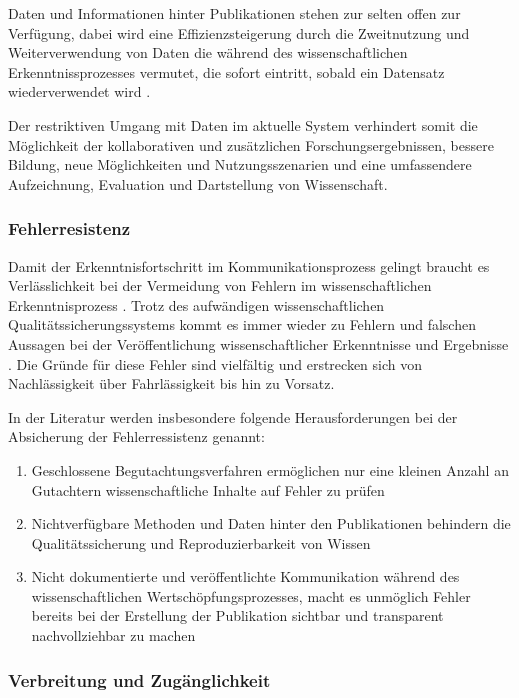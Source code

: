 Daten und Informationen hinter Publikationen stehen zur selten offen zur Verfügung, dabei wird eine Effizienzsteigerung durch die Zweitnutzung und Weiterverwendung von Daten die während des wissenschaftlichen Erkenntnissprozesses vermutet, die sofort eintritt, sobald ein Datensatz wiederverwendet wird \cite{RIN_2010_open_research}.

Der restriktiven Umgang mit Daten im aktuelle System verhindert somit die Möglichkeit der kollaborativen und zusätzlichen Forschungsergebnissen, bessere Bildung, neue Möglichkeiten und Nutzungsszenarien und eine umfassendere Aufzeichnung, Evaluation und Dartstellung von Wissenschaft.

\subsubsection{Fehlerresistenz}

Damit der Erkenntnisfortschritt im Kommunikationsprozess gelingt braucht es Verlässlichkeit bei der Vermeidung von Fehlern im wissenschaftlichen Erkenntnisprozess \cite{Bargheer_2015}. Trotz des aufwändigen wissenschaftlichen Qualitätssicherungssystems kommt es immer wieder zu Fehlern und falschen Aussagen bei der Veröffentlichung wissenschaftlicher Erkenntnisse und Ergebnisse \cite{brembs2015open} \cite{Luescher_2014}. Die Gründe für diese Fehler sind vielfältig und erstrecken sich von  Nachlässigkeit über Fahrlässigkeit bis hin zu Vorsatz.

In der Literatur werden insbesondere folgende Herausforderungen bei der Absicherung der Fehlerressistenz genannt:
\begin{enumerate}
\item Geschlossene Begutachtungsverfahren ermöglichen nur eine kleinen Anzahl an Gutachtern wissenschaftliche Inhalte auf Fehler zu prüfen \cite{suchen}
\item Nichtverfügbare Methoden und Daten hinter den Publikationen behindern die Qualitätssicherung und Reproduzierbarkeit von Wissen \cite{suchen}
\item Nicht dokumentierte und veröffentlichte Kommunikation während des wissenschaftlichen Wertschöpfungsprozesses, macht es unmöglich Fehler bereits bei der Erstellung der Publikation sichtbar und transparent nachvollziehbar zu machen \cite{suchen}
\end{enumerate}

\subsubsection{Verbreitung und Zugänglichkeit}

